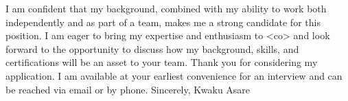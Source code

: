 I am confident that my background, combined with my ability to work both independently and as part of a team, makes me a strong candidate for this position.
\newline{}
\newline{}
I am eager to bring my expertise and enthusiasm to <co> and look forward to the opportunity to discuss how my background, skills, and certifications will be an asset to your team. Thank you for considering my application. I am available at your earliest convenience for an interview and can be reached via email or by phone.
\newline{}
\newline{}\newline{}
\newline{}\newline{}
\newline{}
Sincerely,
\newline{}
\newline{}
Kwaku Asare